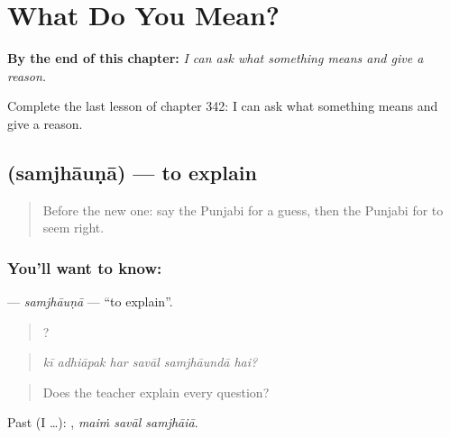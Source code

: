 
\chapter{What Do You Mean?}
\label{ch:pa-a2-what-do-you-mean}

\begin{chapteropening}
\textbf{By the end of this chapter:} \emph{I can ask what something means and give a reason.}

Complete the last lesson of chapter 342: I can ask what something means and give a reason.
\end{chapteropening}

\section[\texorpdfstring{\pa{ਸਮਝਾਉਣਾ} (samjhāuṇā)}{ਸਮਝਾਉਣਾ (samjhāuṇā)}]{ (samjhāuṇā) — to explain}

\label{lesson:PA-C342-samjhauna}



\begin{quote}
Before the new one: say the Punjabi for a guess, then the Punjabi for to seem right.
\end{quote}

\subsection*{You'll want to know: }
\textbf{} — \emph{samjhāuṇā} — \textquotedblleft{}to explain\textquotedblright{}.

\begin{quote}
     ?
\end{quote}

\begin{quote}
\emph{kī adhiāpak har savāl samjhāundā hai?}
\end{quote}

\begin{quote}
Does the teacher explain every question?
\end{quote}

Past (I …):   , \emph{maiṁ savāl samjhāiā}.


